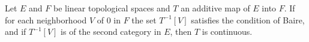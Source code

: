 Let $E$ and $F$ be linear topological spaces and $T$ an additive map of $E$ into $F$. If for each neighborhood $V$ of $0$ in $F$ the set $T^{-1}[V]$ satisfies the condition of Baire, and if $T^{-1}[V]$ is of the second category in $E$, then $T$ is continuous.

